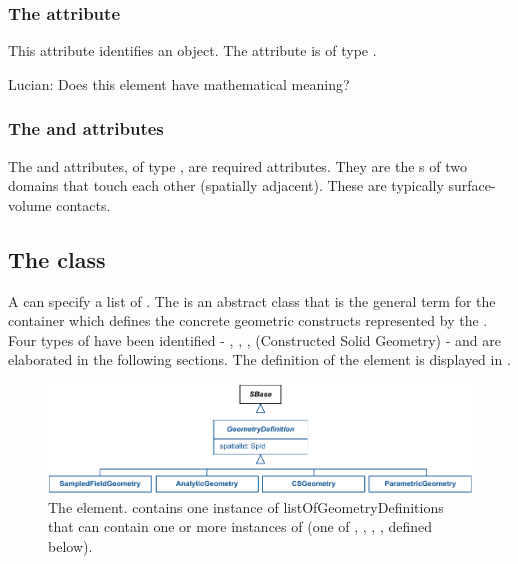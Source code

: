 \subsubsection{The  attribute}
This attribute identifies an \AdjacentDomains object. The attribute is of type .

{\color{red} Lucian: \notice Does this element have mathematical meaning?}

\subsubsection{The  and  attributes}
The  and  attributes, of type , are required attributes. They are the s of two domains that touch each other (spatially adjacent).  These are typically surface-volume contacts.


\subsection{The  class}
\label{GeometryDefinition-class}
A \Geometry can specify a list of \GeometryDefinitions. The \GeometryDefinition is an abstract class that is the general term for the container which defines the concrete geometric constructs represented by the \Geometry. Four types of \GeometryDefinitions have been identified - \AnalyticGeometry, \SampledFieldGeometry, \ParametricGeometry, \CSGeometry (Constructed Solid Geometry) - and are elaborated in the following sections. The definition of the \GeometryDefinition element is displayed in .

\begin{figure}[ht]
  \includegraphics{figs/GeometryDefinition-uml}
  \caption{The \GeometryDefinition element. \Geometry contains one instance of listOfGeometryDefinitions that can contain one or more instances of \GeometryDefinition (one of \AnalyticGeometry, \SampledFieldGeometry, \CSGeometry, \ParametricGeometry, defined below).}
  \label{GeometryDefinition-uml}
\end{figure}

